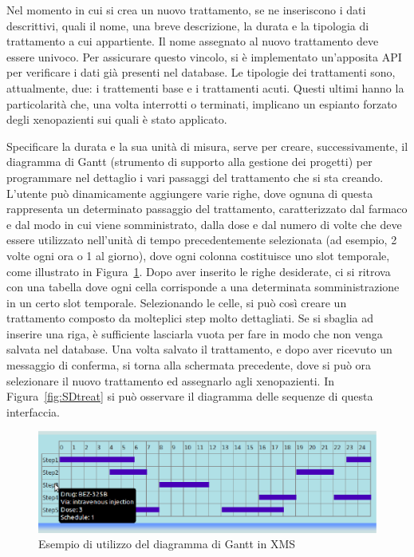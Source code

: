 Nel momento in cui si crea un nuovo trattamento, se ne inseriscono i dati descrittivi, quali il nome, una breve descrizione, la durata e la tipologia di trattamento a cui appartiente. Il nome assegnato al nuovo trattamento deve essere univoco. Per assicurare questo vincolo, si \`e implementato un'apposita API per verificare i dati gi\`a presenti nel database. Le tipologie dei trattamenti sono, attualmente, due: i trattementi base e i trattamenti acuti. Questi ultimi hanno la particolarit\`a che, una volta interrotti o terminati, implicano un espianto forzato degli xenopazienti sui quali \`e stato applicato.

Specificare la durata e la sua unit\`a di misura, serve per creare, successivamente, il diagramma di Gantt (strumento di supporto alla gestione dei progetti\cite{gantt}) per programmare nel dettaglio i vari passaggi del trattamento che si sta creando. L'utente pu\`o dinamicamente aggiungere varie righe, dove ognuna di questa rappresenta un determinato passaggio del trattamento, caratterizzato dal farmaco e dal modo in cui viene somministrato, dalla dose e dal numero di volte che deve essere utilizzato nell'unit\`a di tempo precedentemente selezionata (ad esempio, 2 volte ogni ora o 1 al giorno), dove ogni colonna costituisce uno slot temporale, come illustrato in Figura~\ref{fig:gantt}. Dopo aver inserito le righe desiderate, ci si ritrova con una tabella dove ogni cella corrisponde a una determinata somministrazione in un certo slot temporale. Selezionando le celle, si pu\`o cos\`i creare un trattamento composto da molteplici step molto dettagliati. Se si sbaglia ad inserire una riga, \`e sufficiente lasciarla vuota per fare in modo che non venga salvata nel database. Una volta salvato il trattamento, e dopo aver ricevuto un messaggio di conferma, si torna alla schermata precedente, dove si pu\`o ora selezionare il nuovo trattamento ed assegnarlo agli xenopazienti. In Figura~\ref{fig:SDtreat} si pu\`o osservare il diagramma delle sequenze di questa interfaccia.

\begin{figure}[h]
\begin{center}
\includegraphics[width=1.0\textwidth]{./Figure/gantt}
\end{center}
\caption{Esempio di utilizzo del diagramma di Gantt in XMS\label{fig:gantt}}
\end{figure}

